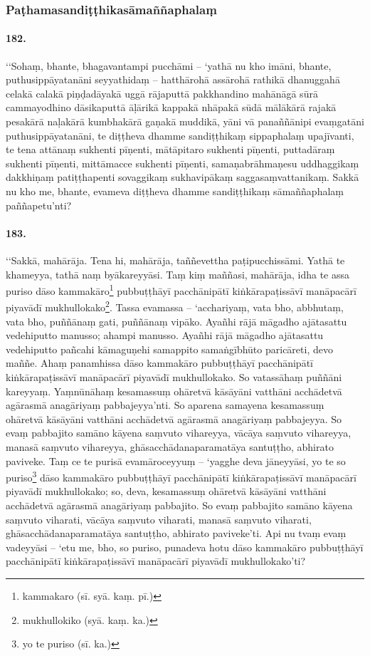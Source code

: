 \subsubsection{Paṭhamasandiṭṭhikasāmaññaphalaṃ}

\paragraph{182.} ‘‘Sohaṃ, bhante, bhagavantampi pucchāmi – ‘yathā nu kho imāni, bhante, puthusippāyatanāni seyyathidaṃ – hatthārohā assārohā rathikā dhanuggahā celakā calakā piṇḍadāyakā uggā rājaputtā pakkhandino mahānāgā sūrā cammayodhino dāsikaputtā āḷārikā kappakā nhāpakā sūdā mālākārā rajakā pesakārā naḷakārā kumbhakārā gaṇakā muddikā, yāni vā panaññānipi evaṃgatāni puthusippāyatanāni, te diṭṭheva dhamme sandiṭṭhikaṃ sippaphalaṃ upajīvanti, te tena attānaṃ sukhenti pīṇenti, mātāpitaro sukhenti pīṇenti, puttadāraṃ sukhenti pīṇenti, mittāmacce sukhenti pīṇenti, samaṇabrāhmaṇesu uddhaggikaṃ dakkhiṇaṃ patiṭṭhapenti sovaggikaṃ sukhavipākaṃ saggasaṃvattanikaṃ. Sakkā nu kho me, bhante, evameva diṭṭheva dhamme sandiṭṭhikaṃ sāmaññaphalaṃ paññapetu’nti?

\paragraph{183.} ‘‘Sakkā, mahārāja. Tena hi, mahārāja, taññevettha paṭipucchissāmi. Yathā te khameyya, tathā naṃ byākareyyāsi. Taṃ kiṃ maññasi, mahārāja, idha te assa puriso dāso kammakāro\footnote{kammakaro (sī. syā. kaṃ. pī.)} pubbuṭṭhāyī pacchānipātī kiṅkārapaṭissāvī manāpacārī piyavādī mukhullokako\footnote{mukhullokiko (syā. kaṃ. ka.)}. Tassa evamassa – ‘acchariyaṃ, vata bho, abbhutaṃ, vata bho, puññānaṃ gati, puññānaṃ vipāko. Ayañhi rājā māgadho ajātasattu vedehiputto manusso; ahampi manusso. Ayañhi rājā māgadho ajātasattu vedehiputto pañcahi kāmaguṇehi samappito samaṅgībhūto paricāreti, devo maññe. Ahaṃ panamhissa dāso kammakāro pubbuṭṭhāyī pacchānipātī kiṅkārapaṭissāvī manāpacārī piyavādī mukhullokako. So vatassāhaṃ puññāni kareyyaṃ. Yaṃnūnāhaṃ kesamassuṃ ohāretvā kāsāyāni vatthāni acchādetvā agārasmā anagāriyaṃ pabbajeyya’nti. So aparena samayena kesamassuṃ ohāretvā kāsāyāni vatthāni acchādetvā agārasmā anagāriyaṃ pabbajeyya. So evaṃ pabbajito samāno kāyena saṃvuto vihareyya, vācāya saṃvuto vihareyya, manasā saṃvuto vihareyya, ghāsacchādanaparamatāya santuṭṭho, abhirato paviveke. Taṃ ce te purisā evamāroceyyuṃ – ‘yagghe deva jāneyyāsi, yo te so puriso\footnote{yo te puriso (sī. ka.)} dāso kammakāro pubbuṭṭhāyī pacchānipātī kiṅkārapaṭissāvī manāpacārī piyavādī mukhullokako; so, deva, kesamassuṃ ohāretvā kāsāyāni vatthāni acchādetvā agārasmā anagāriyaṃ pabbajito. So evaṃ pabbajito samāno kāyena saṃvuto viharati, vācāya saṃvuto viharati, manasā saṃvuto viharati, ghāsacchādanaparamatāya santuṭṭho, abhirato paviveke’ti. Api nu tvaṃ evaṃ vadeyyāsi – ‘etu me, bho, so puriso, punadeva hotu dāso kammakāro pubbuṭṭhāyī pacchānipātī kiṅkārapaṭissāvī manāpacārī piyavādī mukhullokako’ti?

